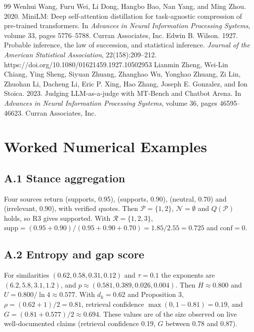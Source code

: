 \documentclass[11pt,a4paper]{article}
\begin{document}
\begin{thebibliography}{99}
Wenhui Wang, Furu Wei, Li Dong, Hangbo Bao, Nan Yang, and Ming Zhou. 2020. MiniLM: Deep self-attention distillation for task-agnostic compression of pre-trained transformers. In \textit{Advances in Neural Information Processing Systems}, volume 33, pages 5776–5788. Curran Associates, Inc.
Edwin B. Wilson. 1927. Probable inference, the law of succession, and statistical inference. \textit{Journal of the American Statistical Association}, 22(158):209–212. https://doi.org/10.1080/01621459.1927.10502953
Lianmin Zheng, Wei-Lin Chiang, Ying Sheng, Siyuan Zhuang, Zhanghao Wu, Yonghao Zhuang, Zi Lin, Zhuohan Li, Dacheng Li, Eric P. Xing, Hao Zhang, Joseph E. Gonzalez, and Ion Stoica. 2023. Judging LLM-as-a-judge with MT-Bench and Chatbot Arena. In \textit{Advances in Neural Information Processing Systems}, volume 36, pages 46595–46623. Curran Associates, Inc.
\end{thebibliography}

\appendix
\section{Worked Numerical Examples}

\subsection{A.1 Stance aggregation}

Four sources return (supports, 0.95), (supports, 0.90), (neutral, 0.70) and (irrelevant, 0.90), with verified quotes. Then $\mathcal{P} = \{1,2\}$, $\mathcal{N} = \emptyset$ and $Q(\mathcal{P})$ holds, so R3 gives supported. With $\mathcal{R} = \{1,2,3\}$, $\mathrm{supp} = (0.95 + 0.90)/(0.95 + 0.90 + 0.70) = 1.85/2.55 = 0.725$ and $\mathrm{conf} = 0$.

\subsection{A.2 Entropy and gap score}

For similarities $(0.62, 0.58, 0.31, 0.12)$ and $\tau = 0.1$ the exponents are $(6.2, 5.8, 3.1, 1.2)$, and $p \approx (0.581, 0.389, 0.026, 0.004)$. Then $H \approx 0.800$ and $U = 0.800/\ln 4 \approx 0.577$. With $d_k = 0.62$ and Proposition 3, $\rho = (0.62+1)/2 = 0.81$, retrieval confidence $\max(0, 1-0.81) = 0.19$, and $G = (0.81 + 0.577)/2 \approx 0.694$. These values are of the size observed on live well-documented claims (retrieval confidence 0.19, $G$ between 0.78 and 0.87).
\end{document}
